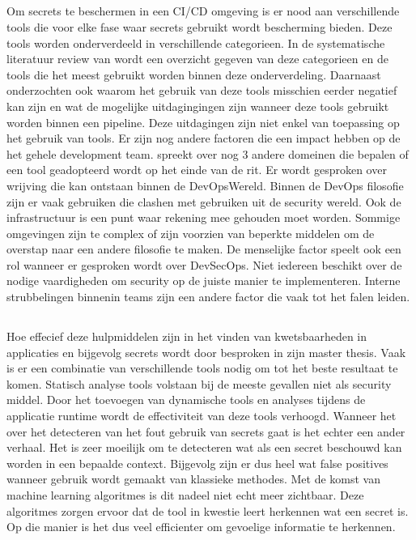 \subsection{}
\label{sec:Het gebruik van tools binnen DevSecOps}
Om secrets te beschermen in een CI/CD omgeving is er nood aan verschillende tools die voor elke fase waar secrets gebruikt wordt bescherming bieden. Deze tools worden onderverdeeld in verschillende categorieen. In de systematische literatuur review van \textcite{Martelleur2022} wordt een overzicht gegeven van deze categorieen en de tools die het meest gebruikt worden binnen deze onderverdeling. Daarnaast onderzochten \textcite{Martelleur2022} ook waarom het gebruik van deze tools misschien eerder negatief kan zijn en wat de mogelijke uitdagingingen zijn wanneer deze tools gebruikt worden binnen een pipeline. Deze uitdagingen zijn niet enkel van toepassing op het gebruik van tools. Er zijn nog andere factoren die een impact hebben op de het gehele development team. \autocite{Rajapakse2022} spreekt over nog 3 andere domeinen die bepalen of een tool geadopteerd wordt op het einde van de rit. Er wordt gesproken over wrijving die kan ontstaan binnen de DevOpsWereld. Binnen de DevOps filosofie zijn er vaak gebruiken die clashen met gebruiken uit de security wereld. Ook de infrastructuur is een punt waar rekening mee gehouden moet worden. Sommige omgevingen zijn te complex of zijn voorzien van beperkte middelen om de overstap naar een andere filosofie te maken. De menselijke factor speelt ook een rol wanneer er gesproken wordt over DevSecOps. Niet iedereen beschikt over de nodige vaardigheden om security op de juiste manier te implementeren. Interne strubbelingen binnenin teams zijn een andere factor die vaak tot het falen leiden.

\subsection{}
\label{sec:DevSecOps tools om secrets te herkennen en beheren}
Hoe effecief deze hulpmiddelen zijn in het vinden van kwetsbaarheden in applicaties en bijgevolg secrets wordt door \textcite{Thulin2015} besproken in zijn master thesis. Vaak is er een combinatie van verschillende tools nodig om tot het beste resultaat te komen. Statisch analyse tools volstaan bij de meeste gevallen niet als security middel. Door het toevoegen van dynamische tools en analyses tijdens de applicatie runtime wordt de effectiviteit van deze tools verhoogd. Wanneer het over het detecteren van het fout gebruik van secrets gaat is het echter een ander verhaal. Het is zeer moeilijk om te detecteren wat als een secret beschouwd kan worden in een bepaalde context. Bijgevolg zijn er dus heel wat false positives wanneer gebruik wordt gemaakt van klassieke methodes. Met de komst van machine learning algoritmes is dit nadeel niet echt meer zichtbaar. Deze algoritmes zorgen ervoor dat de tool in kwestie leert herkennen wat een secret is. Op die manier is het dus veel efficienter om gevoelige informatie te herkennen.
\autocite{Saha2020}

